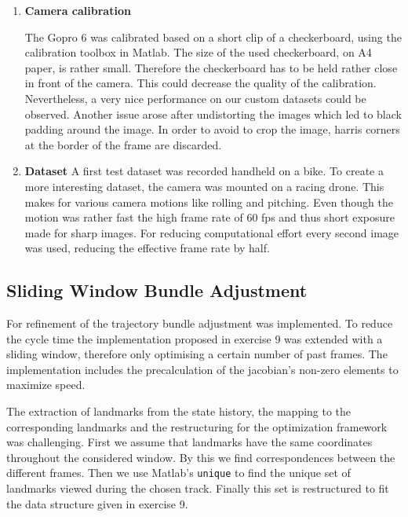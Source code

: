 \documentclass{article}
\begin{document}
\begin{enumerate}
\item \textbf{Camera calibration}


The Gopro 6 was calibrated based on a short clip of a checkerboard, using the calibration toolbox in Matlab. The size of the used checkerboard, on A4 paper, is rather small. Therefore the checkerboard has to be held rather close in front of the camera. This could decrease the quality of the calibration. Nevertheless, a very nice performance on our custom datasets could be observed.  Another issue arose after undistorting the images which led to black padding around the image. In order to avoid to crop the image, harris corners at the border of the frame are discarded.

\item \textbf{Dataset}
A first test dataset was recorded handheld on a bike. To create a more interesting dataset, the camera was mounted on a racing drone. This makes for various camera motions like rolling and pitching. Even though the motion was rather fast the high frame rate of 60 fps and thus short exposure made for sharp images. For reducing computational effort every second image was used, reducing the effective frame rate by half.
\end{enumerate}

\subsection{Sliding Window Bundle Adjustment}
\label{sec:BA}
For refinement of the trajectory bundle adjustment was implemented.
%
To reduce the cycle time the implementation proposed in exercise 9 was extended with a sliding window, therefore only optimising a certain number of past frames.
%
The implementation includes the precalculation of the jacobian's non-zero elements to maximize speed.

The extraction of landmarks from the state history, the mapping to the corresponding landmarks and the restructuring for the optimization framework was challenging.
%
First we assume that landmarks have the same coordinates throughout the considered window.
%
By this we find correspondences between the different frames.
%
Then we use Matlab's \verb+unique+ to find the unique set of landmarks viewed during the chosen track.
%
Finally this set is restructured to fit the data structure given in exercise 9.
\end{document}
